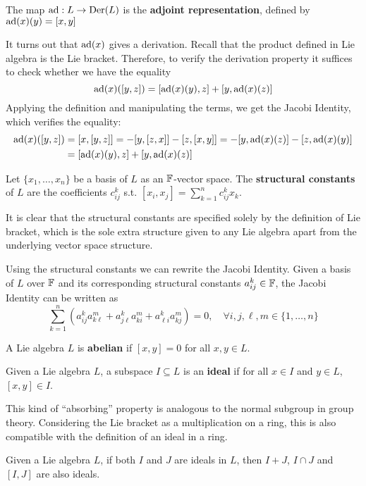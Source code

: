 \documentclass{article}
\begin{document}
\begin{definition}
    The map $\operatorname{ad}: L \to \operatorname{Der}(L)$ is the \textbf{adjoint representation}, defined by $\operatorname{ad}(x)(y) = [x, y]$
\end{definition}

\textstart
It turns out that $\operatorname{ad}(x)$ gives a derivation. Recall that the product defined in Lie algebra is the Lie bracket. Therefore, to verify the derivation property it suffices to check whether we have the equality
\[
    \operatorname{ad}(x)([y, z]) = [\operatorname{ad}(x)(y), z] + [y, \operatorname{ad}(x)(z)]
\]
Applying the definition and manipulating the terms, we get the Jacobi Identity, which verifies the equality:
\begin{align*}
    \operatorname{ad}(x)([y, z])
    & = [x, [y, z]] = -[y, [z, x]] - [z, [x, y]] = -[y, \operatorname{ad}(x)(z)] - [z, \operatorname{ad}(x)(y)] \\
    & = [\operatorname{ad}(x)(y), z] + [y, \operatorname{ad}(x)(z)]
\end{align*}

\begin{definition}
    Let $\{x_1, \dots, x_n\}$ be a basis of $L$ as an $\mathbb{F}$-vector space. The \textbf{structural constants} of $L$ are the coefficients $c_{ij}^k$ s.t. $[x_i, x_j] = \sum_{k = 1}^n c_{ij}^k x_k$.
\end{definition}

\textstart
It is clear that the structural constants are specified solely by the definition of Lie bracket, which is the sole extra structure given to any Lie algebra apart from the underlying vector space structure.

\begin{remark}
    Using the structural constants we can rewrite the Jacobi Identity. Given a basis of $L$ over $\mathbb{F}$ and its corresponding structural constants $a_{ij}^k \in \mathbb{F}$, the Jacobi Identity can be written as
    \[
        \sum_{k = 1}^n \left( a_{ij}^k a_{k \ell}^m + a_{j\ell}^k a_{ki}^m + a_{\ell i}^k a_{kj}^m \right) = 0, \quad \forall i, j, \ell, m \in \{1, \dots, n\}
    \]
\end{remark}

\begin{definition}[Abelian]
    A Lie algebra $L$ is \textbf{abelian} if $[x, y] = 0$ for all $x, y \in L$.
\end{definition}

\begin{definition}[Ideal]
    Given a Lie algebra $L$, a subspace $I \subseteq L$ is an \textbf{ideal} if for all $x \in I$ and $y \in L$, $[x, y] \in I$.
\end{definition}
\nogap
\begin{remark}
    This kind of ``absorbing'' property is analogous to the normal subgroup in group theory. Considering the Lie bracket as a multiplication on a ring, this is also compatible with the definition of an ideal in a ring.
\end{remark}
\nogap
\begin{remark}\label{rmk: extending ideals}
    Given a Lie algebra $L$, if both $I$ and $J$ are ideals in $L$, then $I + J$, $I \cap J$ and $[I, J]$ are also ideals.
\end{remark}
\end{document}
